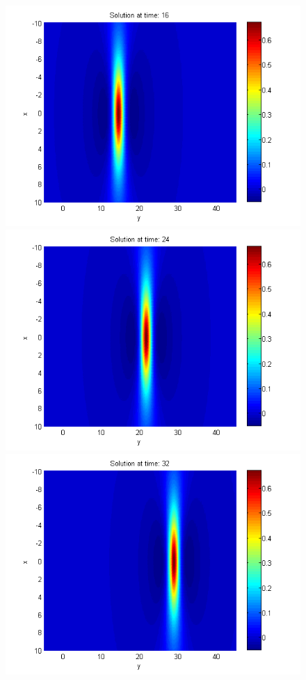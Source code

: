 \documentclass[11pt,a4paper,twoside]{article}
\begin{document}
\begin{figure}[!htbp]
\begin{minipage}[b]{0.31\linewidth}
		 \includegraphics[width=\linewidth]{Pictures/Solution1_t=16.png}
	\end{minipage}
	\begin{minipage}[b]{0.31\linewidth}
		\includegraphics[width=\linewidth]{Pictures/Solution1_t=24.png}
	\end{minipage}	
	\begin{minipage}[b]{0.31\linewidth}
		 \includegraphics[width=\linewidth]{Pictures/Solution1_t=32.png}

\end{minipage}
\end{figure}
\end{document}
